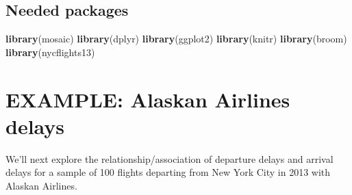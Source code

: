 \documentclass[]{tufte-book}
\newenvironment{Shaded}{\begin{snugshade}}{\end{snugshade}}
\newcommand{\KeywordTok}[1]{\textcolor[rgb]{0.13,0.29,0.53}{\textbf{{#1}}}}
\newcommand{\DataTypeTok}[1]{\textcolor[rgb]{0.13,0.29,0.53}{{#1}}}
\newcommand{\DecValTok}[1]{\textcolor[rgb]{0.00,0.00,0.81}{{#1}}}
\newcommand{\StringTok}[1]{\textcolor[rgb]{0.31,0.60,0.02}{{#1}}}
\newcommand{\CommentTok}[1]{\textcolor[rgb]{0.56,0.35,0.01}{\textit{{#1}}}}
\newcommand{\OtherTok}[1]{\textcolor[rgb]{0.56,0.35,0.01}{{#1}}}
\newcommand{\NormalTok}[1]{{#1}}
\begin{document}
\subsection*{Needed packages}\label{needed-packages-6}

\begin{Shaded}
\begin{Highlighting}[]
\KeywordTok{library}\NormalTok{(mosaic)}
\KeywordTok{library}\NormalTok{(dplyr)}
\KeywordTok{library}\NormalTok{(ggplot2)}
\KeywordTok{library}\NormalTok{(knitr)}
\KeywordTok{library}\NormalTok{(broom)}
\KeywordTok{library}\NormalTok{(nycflights13)}
\end{Highlighting}
\end{Shaded}

\section{EXAMPLE: Alaskan Airlines
delays}\label{example-alaskan-airlines-delays}

We'll next explore the relationship/association of departure delays and
arrival delays for a sample of 100 flights departing from New York City
in 2013 with Alaskan Airlines.

\begin{Shaded}
\end{Shaded}
\end{document}
